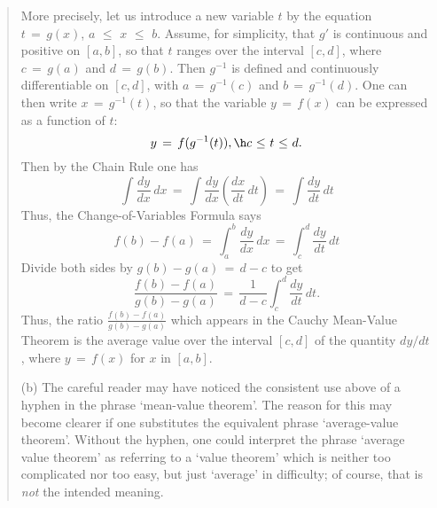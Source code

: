 \begin{quotation}
{        More precisely, let us introduce a new variable $t$ by the equation $t \,=\, g(x)$, $a\,\,{\leq}\,\,x\,\,{\leq}\,\,b$.
    Assume, for simplicity, that $g'$ is continuous and positive on $[a,b]$, so that $t$ ranges over the interval $[c,d]$, where $c \,=\, g(a)$ and $d \,=\, g(b)$.
    Then $g^{-1}$ is defined and continuously differentiable on $[c,d]$, with $a \,=\, g^{-1}(c)$ and $b \,=\, g^{-1}(d)$.
    One can then write $x \,=\, g^{-1}(t)$, so that the variable $y \,=\, f(x)$ can be expressed as a function of $t$:
        \begin{displaymath}
        y \,=\, f(g^{-1}(t)), \h c\,\,{\leq}\,\,t\,\,{\leq}\,\,d.
        \end{displaymath}
    Then by the Chain Rule one has
        \begin{displaymath}
        \int \frac{dy}{dx}\,dx \,=\, \int \frac{dy}{dx}\left(\frac{dx}{dt}\,dt\right) \,=\, 
    \int \frac{dy}{dt}\,dt
        \end{displaymath}
    Thus, the Change-of-Variables Formula says
        \begin{displaymath}
        f(b)-f(a) \,=\, \int_{a}^{b} \frac{dy}{dx}\,dx \,=\, \int_{c}^{d} \frac{dy}{dt}\,dt
        \end{displaymath}
    Divide both sides by $g(b)-g(a) \,=\, d-c$ to get
        \begin{displaymath}
        \frac{f(b)-f(a)}{g(b)-g(a)} \,=\, \frac{1}{d-c} \int_{c}^{d} \frac{dy}{dt}\,dt.
        \end{displaymath}
    Thus, the ratio ${\displaystyle \frac{f(b)-f(a)}{g(b)-g(a)}}$ which appears in the Cauchy Mean-Value Theorem is the average value over the interval $[c,d]$ of the quantity $dy/dt$, where $y \,=\, f(x)$ for $x$ in $[a,b]$.

\V

        (b) The careful reader may have noticed the consistent use above of a hyphen in the phrase `mean-value theorem'.
    The reason for this may become clearer if one substitutes the equivalent phrase `average-value theorem'.
    Without the hyphen, one could interpret the phrase `average value theorem' as referring to a `value theorem' which is neither too complicated nor too easy, 
    but just `average' in difficulty; of course, that is {\em not} the intended meaning.
}%
\end{quotation}

